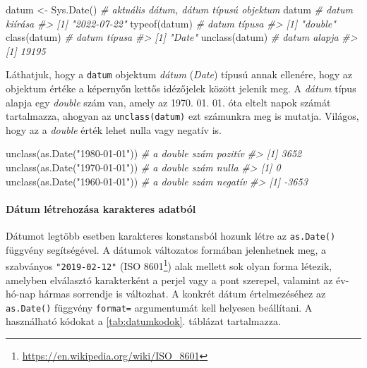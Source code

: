 \documentclass[
]{book}
\newenvironment{Shaded}{\begin{snugshade}}{\end{snugshade}}
\newcommand{\CommentTok}[1]{\textcolor[rgb]{0.56,0.35,0.01}{\textit{#1}}}
\newcommand{\FunctionTok}[1]{\textcolor[rgb]{0.00,0.00,0.00}{#1}}
\newcommand{\NormalTok}[1]{#1}
\newcommand{\OtherTok}[1]{\textcolor[rgb]{0.56,0.35,0.01}{#1}}
\newcommand{\StringTok}[1]{\textcolor[rgb]{0.31,0.60,0.02}{#1}}
\DeclareRobustCommand{\href}[2]{#2\footnote{\url{#1}}}
\renewcommand{\href}[2]{#2\footnote{\url{#1}}}
\begin{document}
\begin{Shaded}
\begin{Highlighting}[]
\NormalTok{datum }\OtherTok{\textless{}{-}} \FunctionTok{Sys.Date}\NormalTok{()    }\CommentTok{\# aktuális dátum, dátum típusú objektum}
\NormalTok{datum                  }\CommentTok{\# datum kiírása}
\CommentTok{\#\textgreater{} [1] "2022{-}07{-}22"}
\FunctionTok{typeof}\NormalTok{(datum)          }\CommentTok{\# datum típusa}
\CommentTok{\#\textgreater{} [1] "double"}
\FunctionTok{class}\NormalTok{(datum)           }\CommentTok{\# datum típusa}
\CommentTok{\#\textgreater{} [1] "Date"}
\FunctionTok{unclass}\NormalTok{(datum)         }\CommentTok{\# datum alapja}
\CommentTok{\#\textgreater{} [1] 19195}
\end{Highlighting}
\end{Shaded}

Láthatjuk, hogy a \texttt{datum} objektum \emph{dátum} (\emph{Date}) típusú annak ellenére, hogy az objektum értéke a képernyőn kettős idézőjelek között jelenik meg. A \emph{dátum} típus alapja egy \emph{double} szám van, amely az 1970. 01. 01. óta eltelt napok számát tartalmazza, ahogyan az \texttt{unclass(datum)} ezt számunkra meg is mutatja. Világos, hogy az a \emph{double} érték lehet nulla vagy negatív is.

\begin{Shaded}
\begin{Highlighting}[]
\FunctionTok{unclass}\NormalTok{(}\FunctionTok{as.Date}\NormalTok{(}\StringTok{"1980{-}01{-}01"}\NormalTok{)) }\CommentTok{\# a double szám pozitív}
\CommentTok{\#\textgreater{} [1] 3652}
\FunctionTok{unclass}\NormalTok{(}\FunctionTok{as.Date}\NormalTok{(}\StringTok{"1970{-}01{-}01"}\NormalTok{)) }\CommentTok{\# a double szám nulla}
\CommentTok{\#\textgreater{} [1] 0}
\FunctionTok{unclass}\NormalTok{(}\FunctionTok{as.Date}\NormalTok{(}\StringTok{"1960{-}01{-}01"}\NormalTok{)) }\CommentTok{\# a double szám negatív}
\CommentTok{\#\textgreater{} [1] {-}3653}
\end{Highlighting}
\end{Shaded}

\hypertarget{duxe1tum-luxe9trehozuxe1sa-karakteres-adatbuxf3l}{%
\paragraph{Dátum létrehozása karakteres adatból}\label{duxe1tum-luxe9trehozuxe1sa-karakteres-adatbuxf3l}}

Dátumot legtöbb esetben karakteres konstansból hozunk létre az \texttt{as.Date()} függvény segítségével. A dátumok változatos formában jelenhetnek meg, a szabványos \texttt{"2019-02-12"} (\href{https://en.wikipedia.org/wiki/ISO_8601}{ISO 8601}) alak mellett sok olyan forma létezik, amelyben elválasztó karakterként a perjel vagy a pont szerepel, valamint az év-hó-nap hármas sorrendje is változhat. A konkrét dátum értelmezéséhez az \texttt{as.Date()} függvény \texttt{format=} argumentumát kell helyesen beállítani. A használható kódokat a \ref{tab:datumkodok}. táblázat tartalmazza.
\end{document}
